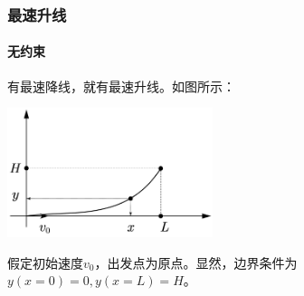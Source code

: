 \subsubsection{最速升线}
\paragraph*{无约束}
\begin{example}
有最速降线，就有最速升线。如图所示：
\begin{center}
\includegraphics[width=6cm]{figure/fastest-ascending.png}
\end{center}
假定初始速度$v_0$，出发点为原点。显然，边界条件为$y(x=0)=0,y(x=L)=H$。
\end{example}
